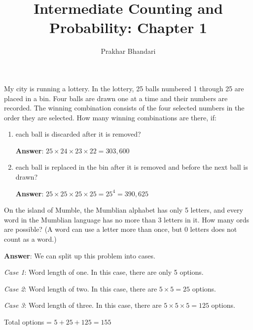 \documentclass[12pt]{article}
\newenvironment{exercise}[2][Exercise]{\begin{trivlist}
\item[\hskip \labelsep {\bfseries #1}\hskip \labelsep {\bfseries #2.}]}{\end{trivlist}}
\begin{document}
 
 
 
\title{Intermediate Counting and Probability: Chapter 1}
\author{Prakhar Bhandari} 
 
\maketitle
 
\begin{exercise}{1.1}
My city is running a lottery. In the lottery, 25 balls numbered 1 through 25 are placed in a bin. Four balls are drawn one at a time and their numbers are recorded. The winning combination consists of the four selected numbers in the order they are selected. How many winning combinations are there, if:
\begin{enumerate}[label=(\alph*)]
\item each ball is discarded after it is removed?

\textbf{Answer}: $25 \times 24 \times 23 \times 22 = \boxed{303,600}$ 
\item each ball is replaced in the bin after it is removed and before the next ball is drawn?

\textbf{Answer}: $25 \times 25 \times 25 \times 25 = 25^4 = \boxed{390,625}$ 
\end{enumerate}
\end{exercise}
 
 

\begin{exercise}{1.2}
On the island of Mumble, the Mumblian alphabet has only 5 letters, and every word in the Mumblian language has no more than 3 letters in it. How many ords are possible? (A word can use a letter more than once, but 0 letters does not count as a word.)

\textbf{{Answer}}: We can split up this problem into cases. 

\textit{Case 1}: Word length of one. In this case, there are only 5 options.

\textit{Case 2}: Word length of two. In this case, there are $5 \times 5 = 25$ options.

\textit{Case 3}: Word length of three. In this case, there are $5 \times 5 \times 5 = 125$ options.

Total options = $5 + 25 + 125 = \boxed{155}$
\end{exercise}
\end{document}
